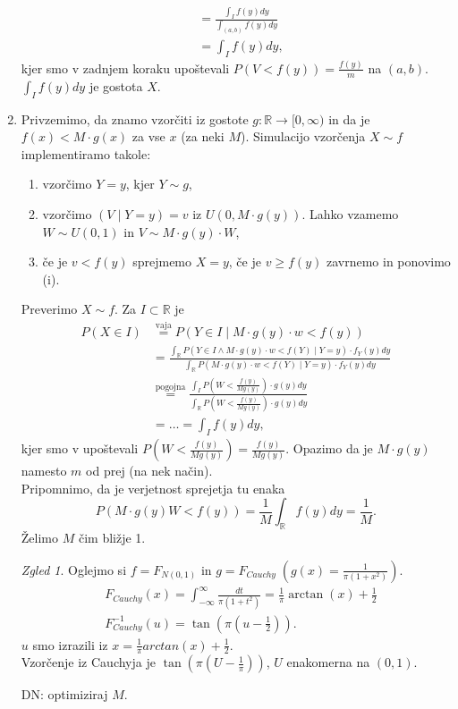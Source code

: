 \documentclass[a4paper, 12pt]{book}
\theoremstyle{definition}
\theoremstyle{remark}
\newtheorem*{exmp}{Zgled}
\newcommand{\R}{\mathbb{R}}
\begin{document}
\begin{enumerate}[label={A/R \#\arabic{*}:}]
\begin{align*}
      &= \frac{\int_{I} f(y) dy}
        {\int_{(a,b)} f(y) dy} \\
      &= \int_I f(y) dy,
    \end{align*}
    kjer smo v zadnjem koraku upoštevali $P(V < f(y)) = \frac{f(y)}{m}$ na $(a,b)$. \\ %
    $\int_I f(y) dy$ je gostota $X$.
  \item Privzemimo, da znamo vzorčiti iz gostote $g: \R \to [0,\infty)$ in da je $f(x) < M \cdot g(x)$ za vse $x$ (za neki $M$).
    Simulacijo vzorčenja $X \sim f$ implementiramo takole:
    \begin{enumerate}[label=(\roman*)]
      \item vzorčimo $Y=y$, kjer $Y \sim g$,
      \item vzorčimo $(V \mid Y=y) = v$ iz $U(0,M \cdot g(y))$.
        Lahko vzamemo $W \sim U(0,1)$ in $V \sim M \cdot g(y) \cdot W$,
      \item če je $v < f(y)$ sprejmemo $X=y$, če je $v \geq f(y)$ zavrnemo in ponovimo (i).
    \end{enumerate}
    Preverimo $X \sim f$. Za $I \subset \R$ je
    \begin{align*}
      P(X \in I) &\stackrel{\text{vaja}}{=} P(Y \in I \mid M \cdot g(y) \cdot w < f(y)) \\
      &= \frac{\int_{\R} P(Y \in I \land M \cdot g(y) \cdot w < f(Y) \mid Y=y) \cdot f_Y(y) dy}
        {\int_{\R} P(M \cdot g(y) \cdot w < f(Y) \mid Y=y) \cdot f_Y(y) dy} \\
      &\stackrel{\text{pogojna}}{=} \frac{\int_{I} P(W < \frac{f(y)}{Mg(y)}) \cdot g(y) dy}
        {\int_{\R} P(W < \frac{f(y)}{Mg(y)}) \cdot g(y) dy} \\
      &= \dots = \int_I f(y) dy,
    \end{align*}
    kjer smo v upoštevali $P(W < \frac{f(y)}{Mg(y)}) = \frac{f(y)}{Mg(y)}$.
    Opazimo da je $M \cdot g(y)$ namesto $m$ od prej (na nek način). \\
    Pripomnimo, da je verjetnost sprejetja tu enaka
    \begin{equation*}
      P(M \cdot g(y) W < f(y)) = \frac{1}{M} \int_{\R} f(y) dy = \frac{1}{M}.
    \end{equation*}
    Želimo $M$ čim bližje 1.
    \begin{exmp}
      Oglejmo si $f = F_{N(0,1)}$ in $g = F_{Cauchy} \; \left(g(x) = \frac{1}{\pi(1+x^2)}\right)$.
      \begin{align*}
        &F_{Cauchy}(x) = \int_{-\infty}^{\infty} \frac{dt}{\pi(1+t^2)} = \frac{1}{\pi} \arctan(x) + \frac{1}{2} \\
        &F_{Cauchy}^{-1}(u) = \tan(\pi\left(u-\frac{1}{2}\right)).
      \end{align*}
      $u$ smo izrazili iz $x = \frac{1}{\pi} arctan(x) + \frac{1}{2}$. \\
      Vzorčenje iz Cauchyja je $\tan(\pi(U-\frac{1}{\pi}))$, $U$ enakomerna na $(0,1)$.
    \end{exmp}
    DN: optimiziraj $M$. %
\end{enumerate}
\end{document}
